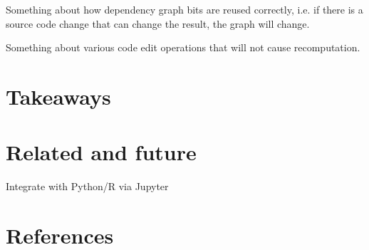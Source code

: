 \documentclass[sigplan,10pt]{acmart}\settopmatter{printfolios=true,printccs=false,printacmref=false}
\theoremstyle{plain}
\theoremstyle{definition}
\begin{document}
Something about how dependency graph bits are reused correctly, i.e. if there is a source code
change that can change the result, the graph will change.

Something about various code edit operations that will not cause recomputation.


\newpage

\section{Takeaways}
\label{sec:design}

\section{Related and future}
\label{sec:future}

Integrate with Python/R via Jupyter

\newpage

\section*{References}



\appendix 
\end{document}
